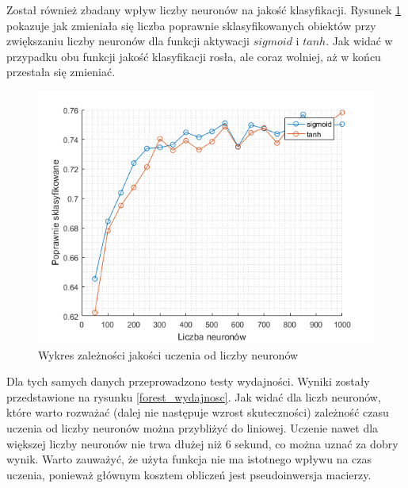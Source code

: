 \documentclass{article}
\begin{document}
Został również zbadany wpływ liczby neuronów na jakość klasyfikacji.
Rysunek \ref{forest_liczba_neuronow} pokazuje jak zmieniała się liczba poprawnie sklasyfikowanych obiektów przy zwiększaniu liczby neuronów dla funkcji aktywacji $sigmoid$ i $tanh$.
Jak widać w przypadku obu funkcji jakość klasyfikacji rosła, ale coraz wolniej, aż w końcu przestała się zmieniać.
\begin{figure}[H]
\centering
\includegraphics[width=\textwidth]{forest_liczba_neuronow.png}
\caption{Wykres zależności jakości uczenia od liczby neuronów}
\label{forest_liczba_neuronow}
\end{figure}

Dla tych samych danych przeprowadzono testy wydajności.
Wyniki zostały przedstawione na rysunku \ref{forest_wydajnosc}.
Jak widać dla liczb neuronów, które warto rozważać (dalej nie następuje wzrost skuteczności) zależność czasu uczenia od liczby neuronów można przybliżyć do liniowej.
Uczenie nawet dla większej liczby neuronów nie trwa dłużej niż 6 sekund, co można uznać za dobry wynik.
Warto zauważyć, że użyta funkcja nie ma istotnego wpływu na czas uczenia, ponieważ głównym kosztem obliczeń jest pseudoinwersja macierzy.
\end{document}
